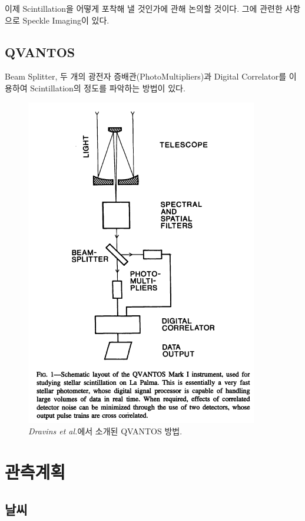 \documentclass[11pt]{article}
\begin{document}
	이제 Scintillation을 어떻게 포착해 낼 것인가에 관해 논의할 것이다. 그에 관련한 사항으로 Speckle Imaging이 있다. \cite{speckle_img}
	
	\subsection{QVANTOS}
	
	Beam Splitter, 두 개의 광전자 증배관(PhotoMultipliers)과 Digital Correlator를 이용하여 Scintillation의 정도를 파악하는 방법이 있다. \cite{AISS.1}
	
	\begin{figure}[h]
		\begin{center}
			\includegraphics[scale=0.5]{QVANTOS.png}
			\caption{\textit{Dravins et al.}에서 소개된 QVANTOS 방법.}
			\label{QVANTOS}
		\end{center}
	\end{figure}
	
	\section{관측계획}
	\subsection{날씨}
	
\end{document}
